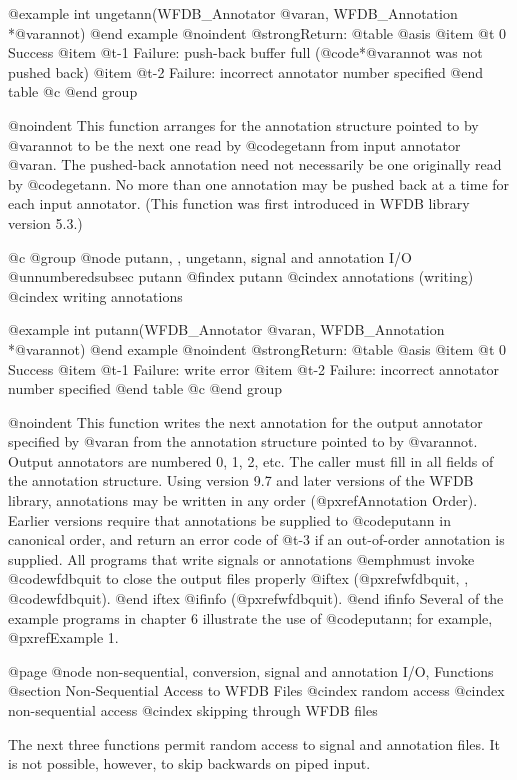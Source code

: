 {{{{{{{{{@example
int ungetann(WFDB_Annotator @var{an}, WFDB_Annotation *@var{annot})
@end example
@noindent
@strong{Return:}
@table @asis
@item @t{ 0}
Success
@item @t{-1}
Failure: push-back buffer full (@code{*@var{annot}} was not pushed back)
@item @t{-2}
Failure: incorrect annotator number specified
@end table
@c @end group

@noindent
This function arranges for the annotation structure pointed to by
@var{annot} to be the next one read by @code{getann} from input
annotator @var{an}.  The pushed-back annotation need not necessarily be
one originally read by @code{getann}.  No more than one annotation may
be pushed back at a time for each input annotator.  (This function was
first introduced in WFDB library version 5.3.)

@c @group
@node     putann, , ungetann, signal and annotation I/O
@unnumberedsubsec putann
@findex putann
@cindex annotations (writing)
@cindex writing annotations

@example
int putann(WFDB_Annotator @var{an}, WFDB_Annotation *@var{annot})
@end example
@noindent
@strong{Return:}
@table @asis
@item @t{ 0}
Success
@item @t{-1}
Failure: write error
@item @t{-2}
Failure: incorrect annotator number specified
@end table
@c @end group

@noindent
This function writes the next annotation for the output annotator specified by
@var{an} from the annotation structure pointed to by @var{annot}.  Output
annotators are numbered 0, 1, 2, etc.  The caller must fill in all fields of
the annotation structure.  Using version 9.7 and later versions of the WFDB
library, annotations may be written in any order (@pxref{Annotation Order}).
Earlier versions require that annotations be supplied to @code{putann} in
canonical order, and return an error code of @t{-3} if an out-of-order
annotation is supplied.  All programs that write signals or annotations
@emph{must} invoke @code{wfdbquit} to close the output files properly
@iftex
(@pxref{wfdbquit, , @code{wfdbquit}}).
@end iftex
@ifinfo
(@pxref{wfdbquit}).
@end ifinfo
Several of the example programs in chapter 6 illustrate the use of
@code{putann}; for example, @pxref{Example 1}.

@page
@node     non-sequential, conversion, signal and annotation I/O, Functions
@section Non-Sequential Access to WFDB Files
@cindex random access
@cindex non-sequential access
@cindex skipping through WFDB files

The next three functions permit random access to signal and annotation
files.  It is not possible, however, to skip backwards on piped
input.

}}}}}}}}}
